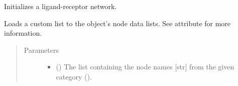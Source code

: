\documentclass[letterpaper,10pt,english]{sphinxmanual}
\begin{document}
\begin{fulllineitems}

\begin{fulllineitems}
\label{\detokenize{main:pypath.main.PyPath.load_ielm}}
\end{fulllineitems}


\begin{fulllineitems}
\label{\detokenize{main:pypath.main.PyPath.load_interfaces}}
\end{fulllineitems}


\begin{fulllineitems}
\label{\detokenize{main:pypath.main.PyPath.load_li2012_ptms}}
\end{fulllineitems}


\begin{fulllineitems}
\label{\detokenize{main:pypath.main.PyPath.load_ligand_receptor_network}}
Initializes a ligand-receptor network.

\end{fulllineitems}


\begin{fulllineitems}
\label{\detokenize{main:pypath.main.PyPath.load_list}}
Loads a custom list to the object’s node data lists. See
 attribute for more
information.
\begin{quote}\begin{description}
\item[{Parameters}] \leavevmode\begin{itemize}
\item {} 
 () \textendash{} The list containing the node names {[}str{]} from the given
category ().


\end{itemize}
\end{description}
\end{quote}
\end{fulllineitems}
\end{fulllineitems}
\end{document}
